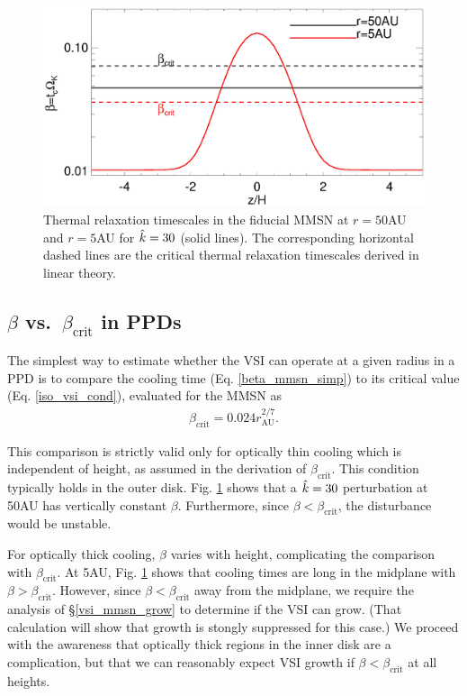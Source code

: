 \begin{figure}
  \includegraphics[width=\linewidth,clip=true,trim=0cm 0cm 0cm
  0cm]{figures/beta_compare}
  \caption{Thermal relaxation timescales in the fiducial MMSN at $r=50$AU
    and $r=5$AU for $\hat{k}=30$ (solid lines). The
    corresponding horizontal dashed lines are the critical thermal
    relaxation timescales derived in linear theory. 
    \label{beta_compare}}
\end{figure}


\subsection{$\beta$ vs.\ $\beta_\mathrm{crit}$ in PPDs}\label{bcritPPD} 
The simplest way to estimate whether the VSI can operate at a given radius in a PPD is to 
compare the cooling time (Eq. \ref{beta_mmsn_simp}) to 
its critical value (Eq. \ref{iso_vsi_cond}), evaluated for the MMSN as    
\begin{align}\label{bcrit_mmsn}
  \beta_\mathrm{crit} = 0.024r_\mathrm{AU}^{2/7}. 
\end{align}

This comparison is strictly valid only for optically thin cooling
which is independent of height, as assumed in the derivation of
$\beta_\mathrm{crit}$.  This condition typically holds in the outer
disk.   Fig. \ref{beta_compare} shows that a  $\hat{k}=30$ perturbation
at 50AU has vertically constant $\beta$. Furthermore, since $\beta <
\beta_\mathrm{crit}$, the disturbance would be unstable. 
 
For optically thick cooling, $\beta$ varies with height, complicating
the comparison with $\beta_\mathrm{crit}$.    
At 5AU, Fig. \ref{beta_compare} shows that cooling times are long in
the midplane with $\beta > \beta_\mathrm{crit}$. 
However, since $\beta < \beta_\mathrm{crit}$ away from the midplane,
we require the analysis of \S\ref{vsi_mmsn_grow} to determine if the
VSI can grow.  (That calculation will show that growth is stongly
suppressed for this case.)  We proceed with the awareness that
optically thick regions in the inner disk are a complication, but that
we can reasonably expect VSI growth if $\beta < \beta_\mathrm{crit}$
at all heights. 


